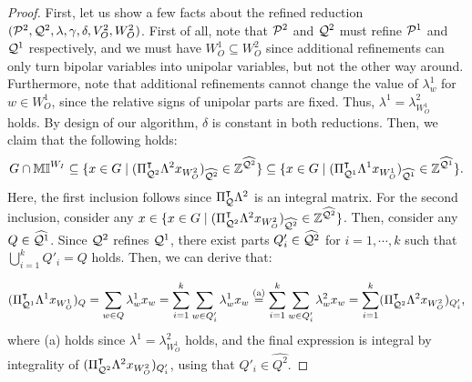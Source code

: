 \documentclass[pdflatex,sn-mathphys-num]{sn-jnl}%
\theoremstyle{thmstyleone}%
\theoremstyle{thmstylethree}%
\theoremstyle{thmstyletwo}%
\begin{document}
\begin{proof}
    First, let us show a few facts about the refined reduction $(\mathcal{P}^2,\mathcal{Q}^2, \lambda, \gamma,\delta,V^2_O,W^2_O)$. First of all, note that $\mathcal{P}^2$ and $\mathcal{Q}^2$ must refine $\mathcal{P}^1$ and $\mathcal{Q}^1$ respectively, and we must have $W^1_O\subseteq W^2_O$ since additional refinements can only turn bipolar variables into unipolar variables, but not the other way around. 
    Furthermore, note that additional refinements cannot change the value of $\lambda^1_w$ for $w\in W^1_O$, since the relative signs of unipolar parts are fixed. Thus, $\lambda^{1} = \lambda^{2}_{W^1_O}$ holds. By design of our algorithm, $\delta$ is constant in both reductions.
    Then, we claim that the following holds:
    \begin{equation*}
        G\cap \mathbb{MI}^{W_I}
        \subseteq \{x \in G \mid (\Pi_{\mathcal{Q}^2}^{\intercal} \Lambda^2 x_{W^2_O})_{\widehat{\mathcal{Q}^2}} \in \mathbb{Z}^{\widehat{\mathcal{Q}^2}}\} \subseteq \{x \in G \mid (\Pi_{\mathcal{Q}^1}^{\intercal} \Lambda^1 x_{W^1_O})_{\widehat{\mathcal{Q}^1}} \in \mathbb{Z}^{\widehat{\mathcal{Q}^1}}\}.
    \end{equation*}
    Here, the first inclusion follows since $\Pi_{\mathcal{Q}}^{\intercal} \Lambda^2$ is an integral matrix. For the second inclusion, consider any $x \in \{x \in G \mid (\Pi_{\mathcal{Q}^2}^{\intercal} \Lambda^2 x_{W^2_O})_{\widehat{\mathcal{Q}^2}} \in \mathbb{Z}^{\widehat{\mathcal{Q}^2}}\}$.
    Then, consider any $Q \in \widehat{\mathcal{Q}^1}$. Since $\mathcal{Q}^2$ refines $\mathcal{Q}^1$, there exist parts $Q'_i \in \widehat{\mathcal{Q}^2}$ for $i=1,\cdots,k$ such that $\bigcup_{i=1}^k Q'_i = Q$ holds. Then, we can derive that:

    \begin{equation*}
    (\Pi_{\mathcal{Q}^1}^{\intercal} \Lambda^1 x_{W^1_O})_{Q} = \sum_{w\in Q} \lambda^1_w x_w = \sum_{i=1}^k \sum_{w\in Q'_i} \lambda^1_w x_w \stackrel{\textup{(a)}}{=} \sum_{i=1}^k \sum_{w\in Q'_i} \lambda^2_w x_w = \sum_{i=1}^k (\Pi_{\mathcal{Q}^2}^{\intercal} \Lambda^2 x_{W^2_O})_{Q'_i},
    \end{equation*}
    where \textup{(a)} holds since $\lambda^1 = \lambda^2_{W^1_O}$ holds, and the final expression is integral by integrality of $(\Pi_{\mathcal{Q}^2}^{\intercal} \Lambda^2 x_{W^2_O})_{Q'_i}$, using that $Q'_i \in \widehat{Q^2}$.
    

\end{proof}
\end{document}
